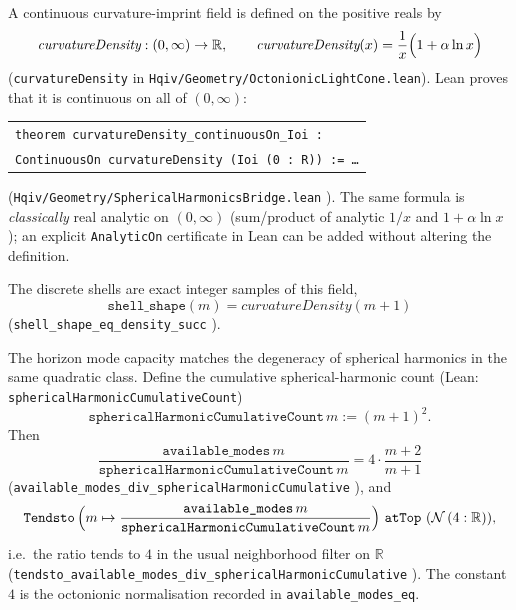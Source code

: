 \documentclass[12pt,a4paper]{article}
\begin{document}
A continuous curvature-imprint field is defined on the positive reals by
\begin{equation}
\textit{curvatureDensity} : (0,\infty) \to \mathbb{R}, \qquad
\textit{curvatureDensity}(x) = \frac{1}{x}\Bigl(1 + \alpha \ln x\Bigr)
\end{equation}
(\texttt{curvatureDensity} in \texttt{Hqiv/Geometry/OctonionicLightCone.lean}). Lean proves that it is continuous on all of \((0,\infty)\):
\begin{center}
\footnotesize
\begin{tabular}{l}
\texttt{theorem curvatureDensity\_continuousOn\_Ioi :} \\
\texttt{ContinuousOn curvatureDensity (Ioi (0 : R)) := \ldots}
\end{tabular}
\end{center}
(\texttt{Hqiv/Geometry/SphericalHarmonicsBridge.lean} \citep{hqiv-lean}). The same formula is \emph{classically} real analytic on \((0,\infty)\) (sum/product of analytic \(1/x\) and \(1+\alpha\ln x\)); an explicit \texttt{AnalyticOn} certificate in Lean can be added without altering the definition.

The discrete shells are exact integer samples of this field,
\[
\texttt{shell\_shape}(m) = \textit{curvatureDensity}(m+1)
\]
(\texttt{shell\_shape\_eq\_density\_succ} \citep{hqiv-lean}).

The horizon mode capacity matches the degeneracy of spherical harmonics in the same quadratic class. Define the cumulative spherical-harmonic count (Lean: \texttt{sphericalHarmonicCumulativeCount})
\[
\texttt{sphericalHarmonicCumulativeCount}\, m := (m+1)^2 .
\]
Then
\[
\frac{\texttt{available\_modes}\, m}{\texttt{sphericalHarmonicCumulativeCount}\, m} = 4 \cdot \frac{m+2}{m+1}
\]
(\texttt{available\_modes\_div\_sphericalHarmonicCumulative} \citep{hqiv-lean}), and
\[
\texttt{Tendsto}\,\Bigl(m \mapsto \frac{\texttt{available\_modes}\, m}{\texttt{sphericalHarmonicCumulativeCount}\, m}\Bigr)\ \texttt{atTop}\ (\mathcal{N}\,(4:\mathbb{R})),
\]
i.e.\ the ratio tends to \(4\) in the usual neighborhood filter on \(\mathbb{R}\) (\texttt{tendsto\_available\_modes\_div\_sphericalHarmonicCumulative} \citep{hqiv-lean}). The constant \(4\) is the octonionic normalisation recorded in \texttt{available\_modes\_eq}.
\end{document}
